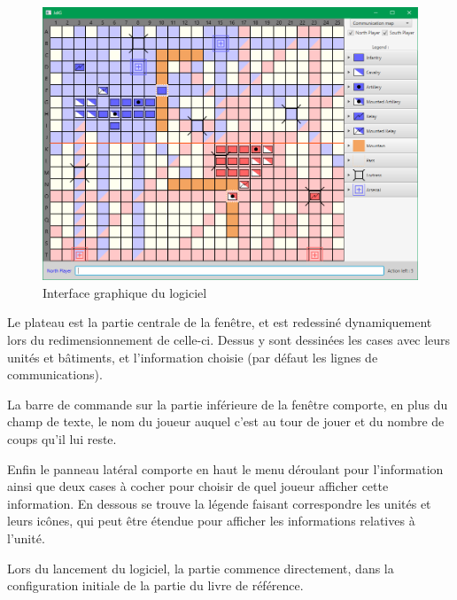 \documentclass[a4paper]{report}
\begin{document}
\begin{figure}[h]
\centering
\includegraphics[width=1.0\textwidth]{interface/ui_full_com}
\caption{Interface graphique du logiciel}\label{fig:presui}
\end{figure}

Le plateau est la partie centrale de la fenêtre, et est redessiné dynamiquement lors du redimensionnement de celle-ci. Dessus y sont dessinées les cases avec leurs unités et bâtiments, et l'information choisie (par défaut les lignes de communications).

La barre de commande sur la partie inférieure de la fenêtre comporte, en plus du champ de texte, le nom du joueur auquel c'est au tour de jouer et du nombre de coups qu'il lui reste.

Enfin le panneau latéral comporte en haut le menu déroulant pour l'information ainsi que deux cases à cocher pour choisir de quel joueur afficher cette information. En dessous se trouve la légende faisant correspondre les unités et leurs icônes, qui peut être étendue pour afficher les informations relatives à l'unité.

Lors du lancement du logiciel, la partie commence directement, dans la configuration initiale de la partie du livre de référence.
\end{document}
